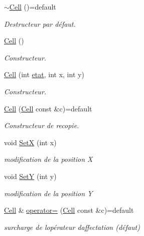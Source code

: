 \begin{DoxyCompactItemize}
\item 
\mbox{\hyperlink{class_cell_a508f988fb5b1ef8358589363c1af3ee4}{$\sim$\+Cell}} ()=default
\begin{DoxyCompactList}\small\item\em Destructeur par défaut. \end{DoxyCompactList}\item 
\mbox{\hyperlink{class_cell_a394510643e8664cf12b5efaf5cb99f71}{Cell}} ()
\begin{DoxyCompactList}\small\item\em Constructeur. \end{DoxyCompactList}\item 
\mbox{\hyperlink{class_cell_abfff4b378d15d85506663df528762eaf}{Cell}} (int \mbox{\hyperlink{cell_8h_ae60adcb558b7f2142c3aa2dd94aaa535}{etat}}, int x, int y)
\begin{DoxyCompactList}\small\item\em Constructeur. \end{DoxyCompactList}\item 
\mbox{\hyperlink{class_cell_aff4c807938a63e9469c1547e7c087e0b}{Cell}} (\mbox{\hyperlink{class_cell}{Cell}} const \&c)=default
\begin{DoxyCompactList}\small\item\em Constructeur de recopie. \end{DoxyCompactList}\item 
void \mbox{\hyperlink{class_cell_a9aaedcce2daccb4aa070f870c1a207ed}{SetX}} (int x)
\begin{DoxyCompactList}\small\item\em modification de la position X \end{DoxyCompactList}\item 
void \mbox{\hyperlink{class_cell_a48afb0c8c8d1ebe3409b9a166dcd507d}{SetY}} (int y)
\begin{DoxyCompactList}\small\item\em modification de la position Y \end{DoxyCompactList}\item 
\mbox{\hyperlink{class_cell}{Cell}} \& \mbox{\hyperlink{class_cell_ac1f905d4cd626cc32963ab7a6f76634e}{operator=}} (\mbox{\hyperlink{class_cell}{Cell}} const \&c)=default
\begin{DoxyCompactList}\small\item\em surcharge de l\textquotesingle{}opérateur d\textquotesingle{}affectation (défaut) \end{DoxyCompactList}\end{DoxyCompactItemize}
